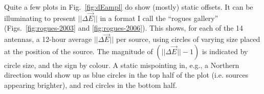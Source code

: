 \documentclass{aa}
\newcommand{\jones}[2]{\vec {#1}_{#2}}
\begin{document}
Quite a few plots in Fig.~\ref{fig:dEampl} do show (mostly) static offsets. It can be illuminating to present $||\Delta\jones{E}{}||$ in a format I call the ``rogues gallery'' (Figs.~\ref{fig:rogues-2003} and \ref{fig:rogues-2006}). This shows, for each of the 14 antennas, a 12-hour average $||\Delta\jones{E}{}||$ per source, using circles of varying size placed at the position of the source. The magnitude of $(||\Delta\jones{E}{}||-1)$ is indicated by circle size, and the sign by colour. A static mispointing in, e.g., a Northern direction would show up as blue circles in the top half of the plot (i.e. sources appearing brighter), and red circles in the bottom half.

\newlength{\roguewidth}
\setlength{\roguewidth}{.2\columnwidth} %

\end{document}
